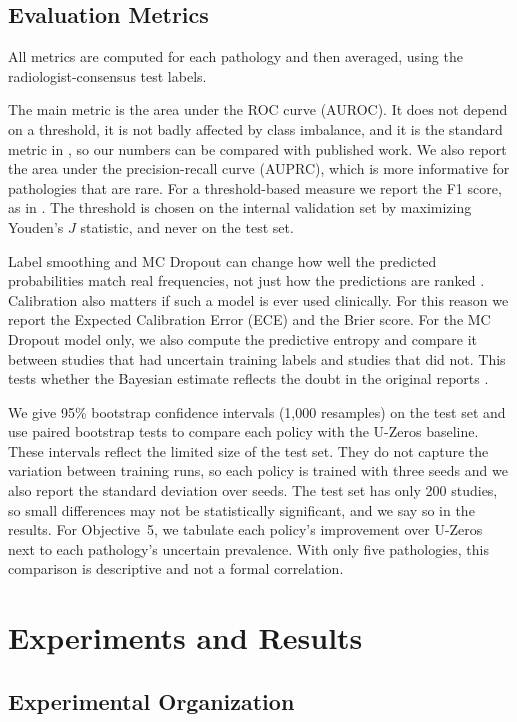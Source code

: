 \documentclass[conference]{IEEEtran}
\begin{document}
\subsection{Evaluation Metrics}

All metrics are computed for each pathology and then averaged, using the radiologist-consensus test labels.

The main metric is the area under the ROC curve (AUROC). It does not depend on a threshold, it is not badly affected by class imbalance, and it is the standard metric in \cite{ref1,ref5}, so our numbers can be compared with published work. We also report the area under the precision-recall curve (AUPRC), which is more informative for pathologies that are rare. For a threshold-based measure we report the F1 score, as in \cite{ref6}. The threshold is chosen on the internal validation set by maximizing Youden's $J$ statistic, and never on the test set.

Label smoothing and MC Dropout can change how well the predicted probabilities match real frequencies, not just how the predictions are ranked \cite{ref11}. Calibration also matters if such a model is ever used clinically. For this reason we report the Expected Calibration Error (ECE) and the Brier score. For the MC Dropout model only, we also compute the predictive entropy and compare it between studies that had uncertain training labels and studies that did not. This tests whether the Bayesian estimate reflects the doubt in the original reports \cite{ref8}.

We give 95\% bootstrap confidence intervals (1{,}000 resamples) on the test set and use paired bootstrap tests to compare each policy with the U-Zeros baseline. These intervals reflect the limited size of the test set. They do not capture the variation between training runs, so each policy is trained with three seeds and we also report the standard deviation over seeds. The test set has only 200 studies, so small differences may not be statistically significant, and we say so in the results. For Objective~5, we tabulate each policy's improvement over U-Zeros next to each pathology's uncertain prevalence. With only five pathologies, this comparison is descriptive and not a formal correlation.

\section{Experiments and Results}

\subsection{Experimental Organization}
\end{document}
